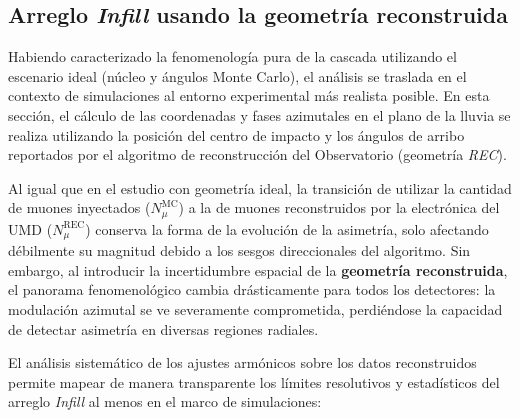 \subsection{Arreglo \textit{Infill} usando la geometría reconstruida}
\label{subsec:infill_rec}

Habiendo caracterizado la fenomenología pura de la cascada utilizando el escenario ideal (núcleo y ángulos Monte Carlo), el análisis se traslada en el contexto de simulaciones al entorno experimental más realista posible. En esta sección, el cálculo de las coordenadas y fases azimutales en el plano de la lluvia se realiza utilizando la posición del centro de impacto y los ángulos de arribo reportados por el algoritmo de reconstrucción del Observatorio (geometría \textit{REC}).

Al igual que en el estudio con geometría ideal, la transición de utilizar la cantidad de muones inyectados ($N_\mu^{\mathrm{MC}}$) a la de muones reconstruidos por la electrónica del UMD ($N_\mu^{\mathrm{REC}}$) conserva la forma de la evolución de la asimetría, solo afectando débilmente su magnitud debido a los sesgos direccionales del algoritmo. Sin embargo, al introducir la incertidumbre espacial de la \textbf{geometría reconstruida}, el panorama fenomenológico cambia drásticamente para todos los detectores: la modulación azimutal se ve severamente comprometida, perdiéndose la capacidad de detectar asimetría en diversas regiones radiales.

El análisis sistemático de los ajustes armónicos sobre los datos reconstruidos permite mapear de manera transparente los límites resolutivos y estadísticos del arreglo \textit{Infill} al menos en el marco de simulaciones:

